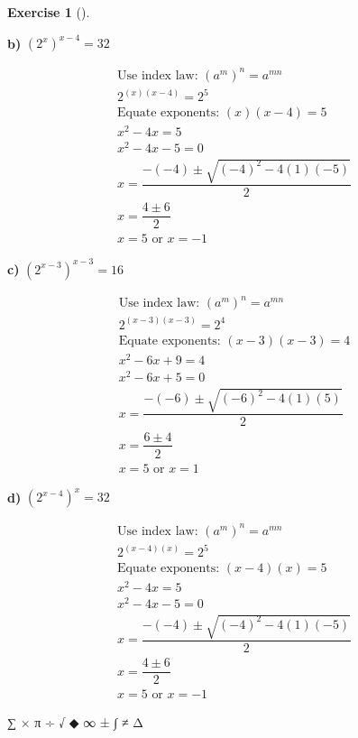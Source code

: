 \documentclass[
  letterpaper,
  DIV=11,
  numbers=noendperiod]{scrreprt}
\theoremstyle{definition}
\newtheorem{exercise}{Exercise}[chapter]
\theoremstyle{remark}
\begin{document}
\begin{exercise}[]
\begin{tcolorbox}
\textbf{b)} \(\displaystyle \left(2^{x}\right)^{x - 4} = 32\)

\begin{align*}
\text{Use index law: } (a^m)^n = a^{mn} \\ 2^{(x)(x - 4)} = 2^{5} \\ \text{Equate exponents: } (x)(x - 4) = 5 \\ x^2 -4x  = 5 \\ x^2 -4x -5 = 0 \\ x = \dfrac{-(-4) \pm \sqrt{(-4)^2 - 4(1)(-5)}}{2} \\ x = \dfrac{4 \pm 6}{2} \\ x = 5 \text{ or } x = -1
\end{align*}

\textbf{c)} \(\displaystyle \left(2^{x - 3}\right)^{x - 3} = 16\)

\begin{align*}
\text{Use index law: } (a^m)^n = a^{mn} \\ 2^{(x - 3)(x - 3)} = 2^{4} \\ \text{Equate exponents: } (x - 3)(x - 3) = 4 \\ x^2 -6x + 9 = 4 \\ x^2 -6x + 5 = 0 \\ x = \dfrac{-(-6) \pm \sqrt{(-6)^2 - 4(1)(5)}}{2} \\ x = \dfrac{6 \pm 4}{2} \\ x = 5 \text{ or } x = 1
\end{align*}

\textbf{d)} \(\displaystyle \left(2^{x - 4}\right)^{x} = 32\)

\begin{align*}
\text{Use index law: } (a^m)^n = a^{mn} \\ 2^{(x - 4)(x)} = 2^{5} \\ \text{Equate exponents: } (x - 4)(x) = 5 \\ x^2 -4x  = 5 \\ x^2 -4x -5 = 0 \\ x = \dfrac{-(-4) \pm \sqrt{(-4)^2 - 4(1)(-5)}}{2} \\ x = \dfrac{4 \pm 6}{2} \\ x = 5 \text{ or } x = -1
\end{align*}

\end{tcolorbox}

\end{exercise}

∑ × π ÷ √ ◆ ∞ ± ∫ ≠ Δ
\end{document}

